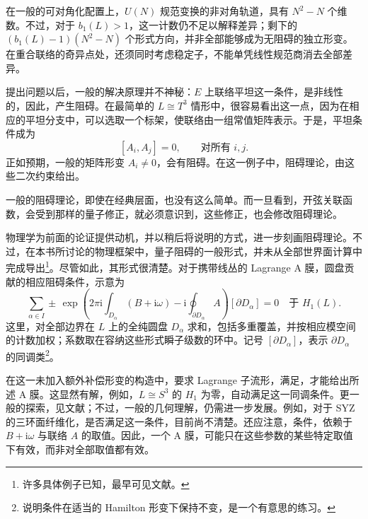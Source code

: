在一般的可对角化配置上，$U(N)$ 规范变换的非对角轨道，具有 $N^2-N$ 个维数。不过，对于 $b_1(L)>1$，这一计数仍不足以解释差异；剩下的 $(b_1(L)-1)(N^2-N)$ 个形式方向，并非全部能够成为无阻碍的独立形变。在重合联络的奇异点处，还须同时考虑稳定子，不能单凭线性规范商消去全部差异。

提出问题以后，一般的解决原理并不神秘：$E$ 上联络平坦这一条件，是非线性的，因此，产生阻碍。在最简单的 $L\cong T^3$ 情形中，很容易看出这一点，因为在相应的平坦分支中，可以选取一个标架，使联络由一组常值矩阵表示。于是，平坦条件成为
\[
[A_i,A_j]=0,\qquad\text{对所有 }i,j.
\]
正如预期，一般的矩阵形变 $A_i\ne0$，会有阻碍。在这一例子中，阻碍理论，由这些二次约束给出。

一般的阻碍理论，即使在经典层面，也没有这么简单。而一旦看到，开弦关联函数，会受到那样的量子修正，就必须意识到，这些修正，也会修改阻碍理论。

物理学为前面的论证提供动机，并以稍后将说明的方式，进一步刻画阻碍理论。不过，在本书所讨论的物理框架中，量子阻碍的一般形式，并未从全部世界面计算中完成导出\footnote{许多具体例子已知，最早可见文献。}。尽管如此，其形式很清楚。对于携带线丛的 Lagrange A 膜，圆盘贡献的相应阻碍条件，示意为
\begin{equation}\label{eq:3.181}
\sum_{\alpha\in I}\pm\,
\exp\left(2\pi\mathrm{i}\int_{D_\alpha}(B+\mathrm{i}\omega)
-\mathrm{i}\oint_{\partial D_\alpha}A\right)
[\partial D_\alpha]=0
\quad\text{于 }H_1(L).
\end{equation}
这里，对全部边界在 $L$ 上的全纯圆盘 $D_\alpha$ 求和，包括多重覆盖，并按相应模空间的计数加权；系数取在容纳这些形式瞬子级数的环中。记号 $[\partial D_\alpha]$，表示 $\partial D_\alpha$ 的同调类\footnote{说明条件在适当的 Hamilton 形变下保持不变，是一个有意思的练习。}。

在这一未加入额外补偿形变的构造中，要求 Lagrange 子流形，满足，才能给出所述 A 膜。这显然有解，例如，$L\cong S^3$ 的 $H_1$ 为零，自动满足这一同调条件。更一般的探索，见文献；不过，一般的几何理解，仍需进一步发展。例如，对于 SYZ 的三环面纤维化，是否满足这一条件，目前尚不清楚。还应注意，条件，依赖于 $B+\mathrm{i}\omega$ 与联络 $A$ 的取值。因此，一个 A 膜，可能只在这些参数的某些特定取值下有效，而非对全部取值都有效。

